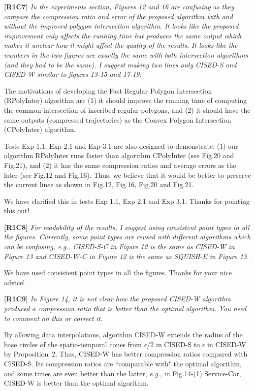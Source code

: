 \documentclass{letter}
\newcommand{\eg}{\emph{e.g.,}\xspace}
\begin{document}
{\textbf{[R1C7]} \emph{In the experiments section, Figures 12 and 16 are confusing as they compare the compression ratio and error of the proposed algorithm with and without the improved polygon intersection algorithm. It looks like the proposed improvement only affects the running time but produces the same output which makes it unclear how it might affect the quality of the results. It looks like the numbers in the two figures are exactly the same with both intersection algorithms (and they had to be the same). I suggest making two lines only CISED-S and CISED-W similar to figures 13-15 and 17-19.}

The motivations of developing the Fast Regular Polygon Intersection (RPolyInter) algorithm are (1) it should improve the running time of computing the common intersection of inscribed regular polygons, and (2) it should have the same outputs (compressed trajectories) as the Convex Polygon Intersection (CPolyInter) algorithm.

Tests Exp 1.1, Exp 2.1 and Exp 3.1 are also designed to demonstrate: (1) our algorithm RPolyInter runs faster than algorithm CPolyInter (see Fig.20 and Fig.21), and (2) it has the same compression ratios and average errors as the later (see Fig.12 and Fig.16).
%
Thus, we believe that it would be better to preserve the current lines as shown in Fig.12, Fig.16, Fig.20 and Fig.21. %

We have clarified this in tests Exp 1.1, Exp 2.1 and Exp 3.1. Thanks for pointing this out!

\textbf{[R1C8]} \emph{For readability of the results, I suggest using consistent point types in all the figures. Currently, some point types are reused with different algorithms which can be confusing, e.g., CISED-S-C in Figure 12 is the same as CISED-W in Figure 13 and CISED-W-C in Figure 12 is the same as SQUISH-E in Figure 13.}

We have used consistent point types in all the figures. Thanks for your nice advice!

\textbf{[R1C9]} \emph{In Figure 14, it is not clear how the proposed CISED-W algorithm produced a compression ratio that is better than the optimal algorithm. You need to comment on this or correct it.}

By allowing data interpolations, algorithm CISED-W extends the radius of the base circles of the spatio-temporal cones from $\epsilon/2$ in CISED-S to $\epsilon$ in CISED-W by Proposition~2. Thus, CISED-W has better compression ratios compared with CISED-S. Its compression ratios are ``comparable with" the optimal algorithm, and some times are even better than the latter, \eg in Fig.14-(1) Service-Car, CISED-W is better than the optimal algorithm.


}
\end{document}
